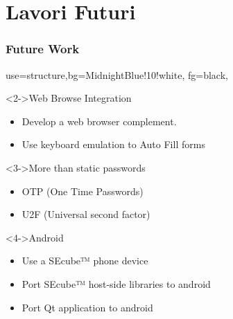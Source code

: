 \documentclass[14pt,usenames,dvipsnames]{beamer}
\begin{document}
\section{Lavori Futuri}
\begin{frame}
	\frametitle{Future Work}
	{
	 {use=structure,bg=MidnightBlue!10!white, fg=black,}
  \fontsize{14pt}{14}\selectfont

	
  \vspace{-0.3cm}	
	  
	\begin{block}<2->{Web Browse Integration}
		\begin{itemize}
		  \item Develop a web browser complement.
			\item Use keyboard emulation to Auto Fill forms
		\end{itemize}
	\end{block}

	\vspace{-0.1cm}	

	\begin{block}<3->{More than static passwords}
		\begin{itemize}
			\item OTP (One Time Passwords)
			\item U2F (Universal second factor)
		\end{itemize}
	\end{block}
	
	\vspace{-0.1cm}	
	
	\begin{block}<4->{Android}
		\begin{itemize}
			\item Use a SEcube™ phone device
			\item Port SEcube™ host-side libraries to android
			\item Port Qt application to android
		\end{itemize}
	\end{block}	
	}
	
\end{frame}


\appendix
\end{document}
